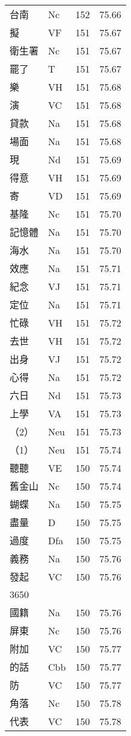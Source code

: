 \documentclass[twocolumn]{book}
\begin{document}
\begin{supertabular}{llrr}
台南 & Nc & 152 &  75.66\\
擬 & VF & 151 &  75.67\\
衛生署 & Nc & 151 &  75.67\\
罷了 & T & 151 &  75.67\\
樂 & VH & 151 &  75.68\\
演 & VC & 151 &  75.68\\
貸款 & Na & 151 &  75.68\\
場面 & Na & 151 &  75.68\\
現 & Nd & 151 &  75.69\\
得意 & VH & 151 &  75.69\\
寄 & VD & 151 &  75.69\\
基隆 & Nc & 151 &  75.70\\
記憶體 & Na & 151 &  75.70\\
海水 & Na & 151 &  75.70\\
效應 & Na & 151 &  75.71\\
紀念 & VJ & 151 &  75.71\\
定位 & Na & 151 &  75.71\\
忙碌 & VH & 151 &  75.72\\
去世 & VH & 151 &  75.72\\
出身 & VJ & 151 &  75.72\\
心得 & Na & 151 &  75.72\\
六日 & Nd & 151 &  75.73\\
上學 & VA & 151 &  75.73\\
（2） & Neu & 151 &  75.73\\
（1） & Neu & 151 &  75.74\\
聽聽 & VE & 150 &  75.74\\
舊金山 & Nc & 150 &  75.74\\
蝴蝶 & Na & 150 &  75.75\\
盡量 & D & 150 &  75.75\\
過度 & Dfa & 150 &  75.75\\
義務 & Na & 150 &  75.76\\
發起 & VC & 150 &  75.76\\
3650\\
國籍 & Na & 150 &  75.76\\
屏東 & Nc & 150 &  75.76\\
附加 & VC & 150 &  75.77\\
的話 & Cbb & 150 &  75.77\\
防 & VC & 150 &  75.77\\
角落 & Nc & 150 &  75.78\\
代表 & VC & 150 &  75.78\\

\end{supertabular}
\end{document}

